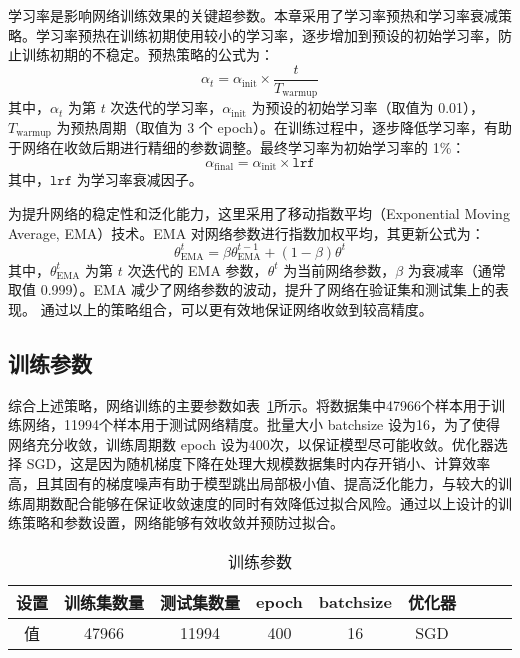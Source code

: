 学习率是影响网络训练效果的关键超参数。本章采用了学习率预热和学习率衰减策略。学习率预热在训练初期使用较小的学习率，逐步增加到预设的初始学习率，防止训练初期的不稳定。预热策略的公式为：
\begin{equation}
	\alpha_t = \alpha_{\text{init}} \times \frac{t}{T_{\text{warmup}}}
\end{equation}
其中，\(\alpha_t\) 为第 \(t\) 次迭代的学习率，\(\alpha_{\text{init}}\) 为预设的初始学习率（取值为 0.01），\(T_{\text{warmup}}\) 为预热周期（取值为 3 个 epoch）。在训练过程中，逐步降低学习率，有助于网络在收敛后期进行精细的参数调整。最终学习率为初始学习率的 1\%：
\begin{equation}
	\alpha_{\text{final}} = \alpha_{\text{init}} \times \texttt{lrf}
\end{equation}
其中，\(\texttt{lrf}\) 为学习率衰减因子。 

为提升网络的稳定性和泛化能力，这里采用了移动指数平均（Exponential Moving Average, EMA）技术。EMA 对网络参数进行指数加权平均，其更新公式为：
\begin{equation}
	\theta_{\text{EMA}}^t = \beta \theta_{\text{EMA}}^{t-1} + (1 - \beta) \theta^t
\end{equation}
其中，\(\theta_{\text{EMA}}^t\) 为第 \(t\) 次迭代的 EMA 参数，\(\theta^t\) 为当前网络参数，\(\beta\) 为衰减率（通常取值 0.999）。EMA 减少了网络参数的波动，提升了网络在验证集和测试集上的表现。
通过以上的策略组合，可以更有效地保证网络收敛到较高精度。

\subsection{训练参数}
综合上述策略，网络训练的主要参数如表~\ref{tab:train_param}所示。将数据集中47966个样本用于训练网络，11994个样本用于测试网络精度。批量大小 batchsize 设为16，为了使得网络充分收敛，训练周期数 epoch 设为400次，以保证模型尽可能收敛。优化器选择 SGD，这是因为随机梯度下降在处理大规模数据集时内存开销小、计算效率高，且其固有的梯度噪声有助于模型跳出局部极小值、提高泛化能力，与较大的训练周期数配合能够在保证收敛速度的同时有效降低过拟合风险。通过以上设计的训练策略和参数设置，网络能够有效收敛并预防过拟合。

\begin{table}[htbp]
	\centering
	\caption{训练参数}
	\label{tab:train_param}
	{%
		\renewcommand{\arraystretch}{1.2}%
		\begin{tabular}{ccccccccc}
			\toprule[1.5pt]
			设置 & 训练集数量 & 测试集数量 & epoch & batchsize & 优化器\\ 
			\midrule[1pt]
			值 & 47966 & 11994 & 400 & 16 & SGD & \\
			\bottomrule[1.5pt]
		\end{tabular}
	}
\end{table}

